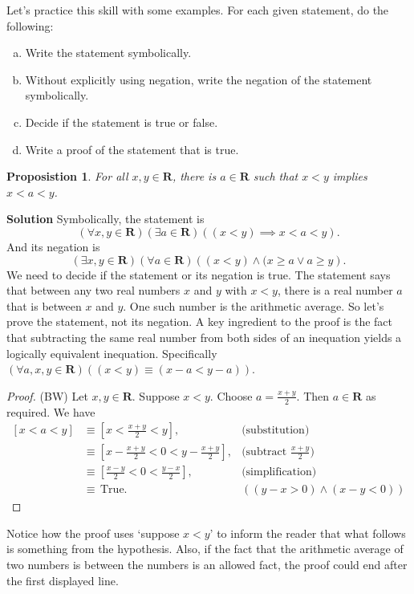 \documentclass[12pt,fleqn,answers]{exam}
\newcommand{\reals}{\mathbf{R}}
\newcommand{\true}{\, \mathrm{True}}
\newenvironment{myproof}
  {\begin{shaded}\begin{proof}}
  {\end{proof}\end{shaded}}
\newtheorem{prop}{Proposistion}
\newenvironment{alphalist}{
  \begin{enumerate}[(a)]
    \addtolength{\itemsep}{-0.50\itemsep}}
  {\end{enumerate}}
\begin{document}
Let's practice this skill with some examples. For each given
statement, do the following: 
\begin{alphalist}
\item Write the statement symbolically.
\item Without explicitly using negation, write the negation of 
    the statement symbolically.
\item Decide if the statement is true or false.
\item  Write a proof of the statement that is true.
\end{alphalist}


\begin{prop}
  For all $x,y \in \reals$, there is $a \in \reals$ such that
    $x < y$ implies $x<a<y$.    
\end{prop}

\noindent \textbf{Solution} Symbolically, the statement is 
    \begin{equation*}
      \left(\forall x,y \in \reals\right)
      \left(\exists a \in \reals \right)
      \left ((x< y) \implies x < a < y\right).
    \end{equation*}
    And its negation is 
     \begin{equation*}
      \left(\exists x,y \in \reals\right)
      \left(\forall a \in \reals \right)
      \left ((x< y) \land (x \geq a \lor a \geq y \right).
    \end{equation*}
    We need to decide if the statement or its negation is true. The statement says that between any two real 
    numbers $x$ and $y$ with $x < y$, there is  a real number $a$ that is between $x$ and $y$. One such number is the arithmetic average. So   let's prove the statement, not its negation.
     A key ingredient to the proof is the fact that subtracting
     the same real number from both sides of an inequation yields 
     a logically equivalent inequation. Specifically  
     $(\forall a,x,y \in \reals)( (x< y) \equiv (x-a < y-a))$.   
    \begin{myproof} (BW)
     Let $x,y \in \reals$. Suppose $x < y$. Choose $a = \frac{x+y}{2}$.
     Then $a \in \reals$ as required. We have
     \begin{align*}
       \left[ x < a < y \right] 
           &\equiv \left[ x < \frac{x+y}{2} < y \right], &\mbox{(substitution)} \\
           & \equiv \left[ x - \frac{x+y}{2} < 0 < y - \frac{x+y}{2}  \right], &\mbox{(subtract $\frac{x+y}{2}$)} \\
           & \equiv \left[ \frac{x-y}{2} < 0 < \frac{y-x}{2}  \right], &\mbox{(simplification)} \\
           & \equiv \true. &((y-x > 0) \land (x-y < 0))
     \end{align*} 
        \end{myproof}
      \noindent Notice how the proof uses `suppose $x < y$' to 
      inform the reader that what follows is something from the hypothesis.
      Also, if the fact that the arithmetic average of two numbers is between the numbers is an allowed fact, the proof
     could end after the first displayed line.
\end{document}
